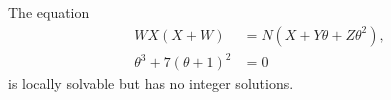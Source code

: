 \begin{proposition}
    The equation
\[
    \begin{aligned}WX(X+W)&=N(X+Y\theta+Z\theta^2),\\ \theta^3+7(\theta+1)^2&=0\end{aligned}
\]
    is locally solvable but has no integer solutions.
\end{proposition}

